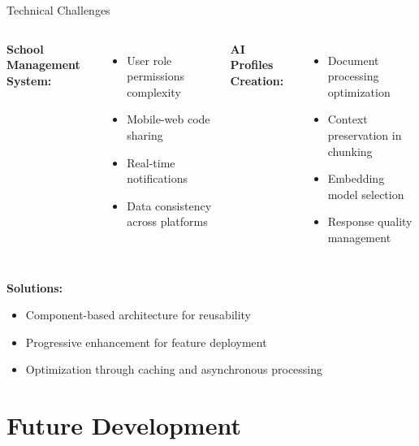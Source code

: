 \documentclass[aspectratio=169]{beamer}
\begin{document}
\begin{frame}{Technical Challenges}
    \begin{columns}
        \textbf{School Management System:}
        \begin{itemize}
            \item User role permissions complexity
            \item Mobile-web code sharing
            \item Real-time notifications
            \item Data consistency across platforms
        \end{itemize}
        \textbf{AI Profiles Creation:}
        \begin{itemize}
            \item Document processing optimization
            \item Context preservation in chunking
            \item Embedding model selection
            \item Response quality management
        \end{itemize}
    \end{columns}
    \vspace{0.5cm}
    \textbf{Solutions:}
    \begin{itemize}
        \item Component-based architecture for reusability
        \item Progressive enhancement for feature deployment
        \item Optimization through caching and asynchronous processing
    \end{itemize}
\end{frame}

\section{Future Development}
\end{document}
